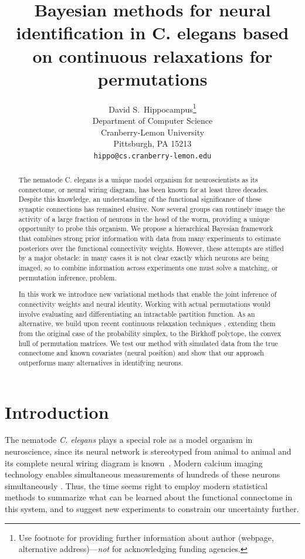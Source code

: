 \documentclass{article}
\title{Bayesian methods for neural identification in C. elegans based on continuous relaxations for permutations}
\author{
  David S.~Hippocampus\thanks{Use footnote for providing further
    information about author (webpage, alternative
    address)---\emph{not} for acknowledging funding agencies.} \\
  Department of Computer Science\\
  Cranberry-Lemon University\\
  Pittsburgh, PA 15213 \\
  \texttt{hippo@cs.cranberry-lemon.edu} \\
}
\begin{document}

\maketitle

\begin{abstract}
  The nematode C. elegans is a unique model organism for
  neuroscientists as its connectome, or neural wiring diagram, has
  been known for at least three decades. Despite this knowledge, an
  understanding of the functional significance of these synaptic
  connections has remained elusive. Now several groups can routinely
  image the activity of a large fraction of neurons in the head of the
  worm, providing a unique opportunity to probe this organism. We
  propose a hierarchical Bayesian framework that combines strong
  prior information with data from many experiments to estimate
  posteriors over the functional connectivity weights. However, these
  attempts are stifled by a major obstacle: in many cases it is not
  clear exactly which neurons are being imaged, so to combine
  information across experiments one must solve a matching, or
  permutation inference, problem.

  In this work we introduce new variational methods that enable the
  joint inference of connectivity weights and neural identity. Working
  with actual permutations would involve evaluating and
  differentiating an intractable partition function. As an
  alternative, we build upon recent continuous relaxation techniques
  \citep{Jang2016, Maddison2016}, extending them from the
  original case of the probability simplex, to the Birkhoff polytope,
  the convex hull of permutation matrices. We test our method with
  simulated data from the true connectome and known
  covariates (neural position) and show that our approach outperforms
  many alternatives in identifying neurons.
\end{abstract}



\section{Introduction}
The nematode \textit{C. elegans} plays a special role as a model organism
in neuroscience, since its neural network is stereotyped from animal to
animal and its complete neural wiring diagram is
known~\citep{varshney2011structural}.  
Modern calcium imaging technology enables simultaneous measurements of
hundreds of these neurons simultaneously \citep{Kato2015,
  nguyen2016whole}. Thus, the time seems right to employ modern statistical methods to summarize what can
be learned about the functional connectome in this system, and to suggest new experiments to constrain our uncertainty further.  
  
\end{document}
